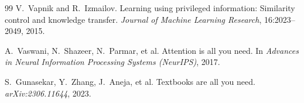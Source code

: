 \documentclass[11pt]{article}
\begin{document}
\begin{thebibliography}{99}
V.~Vapnik and R.~Izmailov.
\newblock Learning using privileged information: Similarity control and knowledge transfer.
\newblock \emph{Journal of Machine Learning Research}, 16:2023--2049, 2015.

A.~Vaswani, N.~Shazeer, N.~Parmar, et al.
\newblock Attention is all you need.
\newblock In \emph{Advances in Neural Information Processing Systems (NeurIPS)}, 2017.

S.~Gunasekar, Y.~Zhang, J.~Aneja, et al.
\newblock Textbooks are all you need.
\newblock \emph{arXiv:2306.11644}, 2023.

\end{thebibliography}
\end{document}

